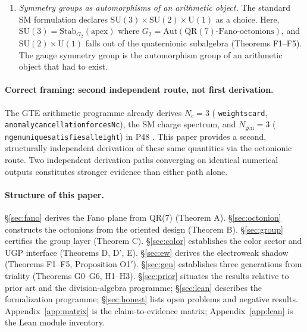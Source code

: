 \documentclass[11pt]{article}
\theoremstyle{remark}
\newcommand{\lean}[1]{%
  \penalty-100
  \begingroup\def\_{\textunderscore\allowbreak}\texttt{#1}\endgroup}
\begin{document}
\begin{enumerate}[noitemsep]
    $\mathbb{O}$-successor exists.
    The bridge translates this into the GTE language: $\mathrm{GF}(7)$ is the
    last rung because the tower itself ends there.
    An answer to ``why~7?'' that makes no reference to GTE's internal structure:
    7 is the unique prime $p$ whose quadratic residues orient a normed division
    algebra, and the octonions are the terminal object of the only such tower
    mathematics permits.
    The base-rate analysis (\S\ref{sec:honest}) sharpens this: of the 13 named
    joints in the derivation chain
    $\mathrm{QR}(7)\!\to\!\mathrm{Fano}\!\to\!\mathbb{O}\!\to\!G_2\!\to\!\mathrm{SU}(3)$,
    eleven are mathematical theorems with no free parameter.
    The framework's foundation transforms from a self-consistent construction
    to a forced structure.
  \item \textit{Symmetry groups as automorphisms of an arithmetic object.}
    The standard SM formulation declares $\mathrm{SU}(3)\times\mathrm{SU}(2)\times
    \mathrm{U}(1)$ as a choice. Here, $\mathrm{SU}(3) = \mathrm{Stab}_{G_2}(\mathrm{apex})$
    where $G_2 = \mathrm{Aut}(\mathrm{QR}(7)\text{-Fano-octonions})$, and
    $\mathrm{SU}(2)\times\mathrm{U}(1)$ falls out of the quaternionic subalgebra
    (Theorems F1--F5). The gauge symmetry group is the automorphism group of an
    arithmetic object that had to exist.
\end{enumerate}

\paragraph{Correct framing: second independent route, not first derivation.}
The GTE arithmetic programme already derives $N_c=3$
(\lean{weights\_card}, \lean{anomaly\_cancellation\_forces\_Nc\_3}),
the SM charge spectrum, and $N_{\mathrm{gen}}=3$
(\lean{ngen\_3\_unique\_satisfies\_all\_eight}) in P48
\cite{SpivackGTECompleteFramework}.
This paper provides a second, structurally independent derivation of these
same quantities via the octonionic route.
Two independent derivation paths converging on identical numerical outputs
constitutes stronger evidence than either path alone.

\paragraph{Structure of this paper.}
\S\ref{sec:fano} derives the Fano plane from QR(7) (Theorem A).
\S\ref{sec:octonion} constructs the octonions from the oriented design (Theorem B).
\S\ref{sec:group} certifies the group layer (Theorem C).
\S\ref{sec:color} establishes the color sector and UGP interface (Theorems D, D', E).
\S\ref{sec:ew} derives the electroweak shadow (Theorems F1--F5, Proposition O1$'$).
\S\ref{sec:gen} establishes three generations from triality (Theorems G0--G6, H1--H3).
\S\ref{sec:prior} situates the results relative to prior art and the division-algebra
programme; \S\ref{sec:lean} describes the formalization programme;
\S\ref{sec:honest} lists open problems and negative results.
Appendix~\ref{app:matrix} is the claim-to-evidence matrix;
Appendix~\ref{app:lean} is the Lean module inventory.
\end{document}
